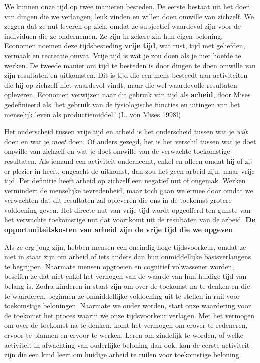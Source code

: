 \documentclass[
  a5paper,
  smalldemyvopaper,11pt,twoside,onecolumn,openright,extrafontsizes,
hidelinks]{memoir}
\begin{document}
We kunnen onze tijd op twee manieren besteden. De eerste bestaat uit het
doen van dingen die we verlangen, leuk vinden en willen doen omwille van
zichzelf. We zeggen dat ze nut leveren op zich, omdat ze subjectief
waardevol zijn voor de individuen die ze ondernemen. Ze zijn in zekere
zin hun eigen beloning. Economen noemen deze tijdsbesteding
\textbf{vrije tijd}, wat rust, tijd met geliefden, vermaak en recreatie
omvat. Vrije tijd is wat je zou doen als je niet hoefde te werken. De
tweede manier om tijd te besteden is door dingen te doen omwille van
zijn resultaten en uitkomsten. Dit is tijd die een mens besteedt aan
activiteiten die hij op zichzelf niet waardevol vindt, maar die wel
waardevolle resultaten opleveren. Economen verwijzen naar dit gebruik
van tijd als \textbf{arbeid}, door Mises gedefinieerd als `het gebruik
van de fysiologische functies en uitingen van het menselijk leven als
productiemiddel.' (L. von Mises 1998l)

Het onderscheid tussen vrije tijd en arbeid is het onderscheid tussen
wat je \emph{wilt} doen en wat je \emph{moet} doen. Of anders gezegd,
het is het verschil tussen wat je doet omwille van zichzelf en wat je
doet omwille van de verwachte toekomstige resultaten. Als iemand een
activiteit onderneemt, enkel en alleen omdat hij of zij er plezier in
heeft, ongeacht de uitkomst, dan zou het geen arbeid zijn, maar vrije
tijd. Per definitie heeft arbeid op zichzelf een negatief nut of
ongemak. Werken vermindert de menselijke tevredenheid, maar toch gaan we
ermee door omdat we verwachten dat dit resultaten zal opleveren die ons
in de toekomst grotere voldoening geven. Het directe nut van vrije tijd
wordt opgeofferd ten gunste van het verwachte toekomstige nut dat
voortkomt uit de resultaten van de arbeid. \textbf{De
opportuniteitskosten van arbeid zijn de vrije tijd die we opgeven}.

Als ze erg jong zijn, hebben mensen een oneindig hoge tijdsvoorkeur,
omdat ze niet in staat zijn om arbeid of iets anders dan hun
onmiddellijke basisverlangens te begrijpen. Naarmate mensen opgroeien en
cognitief volwassener worden, beseffen ze dat niet enkel het verhogen
van de waarde van hun huidige tijd van belang is. Zodra kinderen in
staat zijn om over de toekomst na te denken en die te waarderen,
beginnen ze onmiddellijke voldoening uit te stellen in ruil voor
toekomstige beloningen. Naarmate we ouder worden, start onze waardering
voor de toekomst het proces waarin we onze tijdsvoorkeur verlagen. Met
het vermogen om over de toekomst na te denken, komt het vermogen om
erover te redeneren, ervoor te plannen en ervoor te werken. Leren om
zindelijk te worden, of welke activiteit in afwachting van ouderlijke
beloning dan ook, kan de eerste activiteit zijn die een kind leert om
huidige arbeid te ruilen voor toekomstige beloning.
\end{document}
